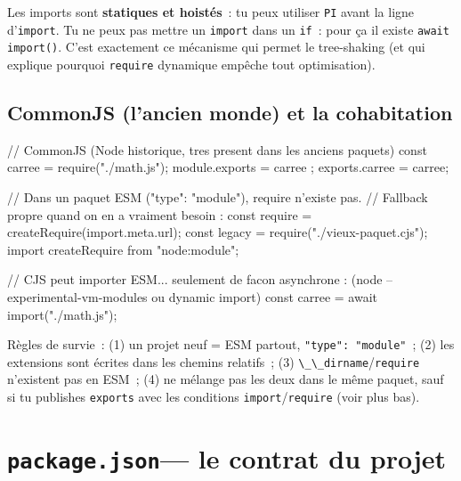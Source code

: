 \documentclass[12pt,a4paper,twoside,openright]{book}
\begin{document}
\begin{note}
Les imports sont \textbf{statiques et hoist\'es}~: tu peux utiliser \texttt{PI} avant la ligne
d'\texttt{import}. Tu ne peux pas mettre un \texttt{import} dans un \texttt{if}~: pour \c{c}a il
existe \texttt{await import()}. C'est exactement ce m\'ecanisme qui permet le tree-shaking
(et qui explique pourquoi \texttt{require} dynamique emp\^eche tout optimisation).
\end{note}

\subsection{CommonJS (l'ancien monde) et la cohabitation}

\begin{codejs}
// CommonJS (Node historique, tres present dans les anciens paquets)
const { carree } = require("./math.js");
module.exports = { carree };
exports.carree = carree;

// Dans un paquet ESM ("type": "module"), require n'existe pas.
// Fallback propre quand on en a vraiment besoin :
const require = createRequire(import.meta.url);
const legacy = require("./vieux-paquet.cjs");
import { createRequire } from "node:module";

// CJS peut importer ESM... seulement de facon asynchrone : (node --experimental-vm-modules ou dynamic import)
const { carree } = await import("./math.js");
\end{codejs}

R\`egles de survie~: (1) un projet neuf = ESM partout, \verb|"type": "module"|~;
(2) les extensions sont \'ecrites dans les chemins relatifs~;
(3) \verb|\_\_dirname|/\verb|require| n'existent pas en ESM~;
(4) ne m\'elange pas les deux dans le m\^eme paquet, sauf si tu publishes
\verb|exports| avec les conditions \verb|import|/\verb|require| (voir plus bas).

\section{\texttt{package.json}--- le contrat du projet}
\end{document}
